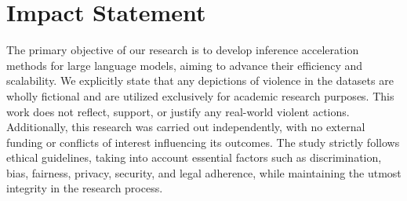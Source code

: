 \section*{Impact Statement}
The primary objective of our research is to develop inference acceleration methods for large language models, aiming to advance their efficiency and scalability. We explicitly state that any depictions of violence in the datasets are wholly fictional and are utilized exclusively for academic research purposes. This work does not reflect, support, or justify any real-world violent actions. Additionally, this research was carried out independently, with no external funding or conflicts of interest influencing its outcomes. The study strictly follows ethical guidelines, taking into account essential factors such as discrimination, bias, fairness, privacy, security, and legal adherence, while maintaining the utmost integrity in the research process.